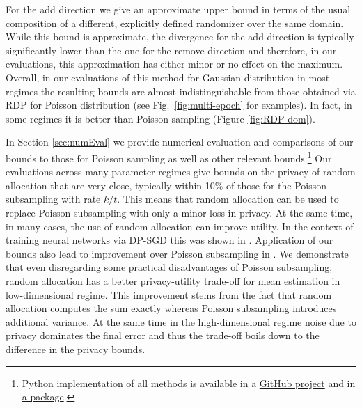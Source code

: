 \documentclass{article}
\theoremstyle{plain}
\theoremstyle{definition}
\begin{document}
For the add direction we give an approximate upper bound in terms of the usual composition of a different, explicitly defined randomizer over the same domain. While this bound is approximate, the divergence for the add direction is typically significantly lower than the one for the remove direction and therefore, in our evaluations, this approximation has either minor or no effect on the maximum.  
Overall, in our evaluations of this method for Gaussian distribution in most regimes the resulting bounds are almost indistinguishable from those obtained via RDP for Poisson distribution (see Fig.~\ref{fig:multi-epoch} for examples). In fact, in some regimes
it is better than Poisson sampling (Figure \ref{fig:RDP-dom}). 

 In Section \ref{sec:numEval} we provide numerical evaluation and comparisons of our bounds to those for Poisson sampling as well as other relevant bounds.\footnote{Python implementation of all methods is available in a \href{https://github.com/moshenfeld/random_allocation.git}{GitHub project} and in \href{https://pypi.org/project/random-allocation/}{a package}.} Our evaluations across many parameter regimes give bounds on the privacy of random allocation that are very close, typically within 10\% of those for the Poisson subsampling with rate $k/t$. This means that random allocation can be used to replace Poisson subsampling with only a minor loss in privacy. At the same time, in many cases, the use of random allocation can improve utility. In the context of training neural networks via DP-SGD this was shown in \citep{CGHLKKMSZ24}. Application of our bounds also lead to improvement over Poisson subsampling in \citep{AFKRT25}. We demonstrate that even disregarding some practical disadvantages of Poisson subsampling, random allocation has a better privacy-utility trade-off for mean estimation in low-dimensional regime. This improvement stems from the fact that random allocation computes the sum exactly whereas Poisson subsampling introduces additional variance. At the same time in the high-dimensional regime noise due to privacy dominates the final error and thus the trade-off boils down to the difference in the privacy bounds.
\end{document}
